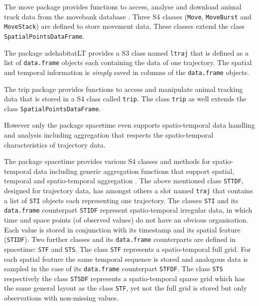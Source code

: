 \documentclass[12pt, oneside, a4paper]{scrbook}
\newcommand{\pkg}[1]{{\normalfont\fontseries{b}\selectfont #1}}
\let\code=\texttt
\begin{document}
The \pkg{move} package provides functions to access, analyse and download animal track data from the movebank database \citep{wikelski_movebank:_2011}. Three S4 classes (\code{Move}, \code{MoveBurst} and \code{MoveStack}) are defined to store movement data. These classes extend the class \code{SpatialPointsDataFrame}. 
\par\medskip

The package \pkg{adehabitatLT} provides a S3 class named \code{ltraj} that is defined as a list of \code{data.frame} objects each containing the data of one trajectory. The spatial and temporal information is \textit{simply} saved in columns of the \code{data.frame} objects.
\par\medskip

The \pkg{trip} package provides functions to access and manipulate animal tracking data that is stored in a S4 class called \code{trip}. The class \code{trip} as well extends the class \code{SpatialPointsDataFrame}.
\par\medskip

However only the package \pkg{spacetime} even supports spatio-temporal data handling and analysis including aggregation that respects the spatio-temporal characteristics of trajectory data.
\par\medskip

The package \pkg{spacetime} provides various S4 classes and methods for spatio-temporal data including generic aggregation functions that support spatial, temporal and spatio-temporal aggregation \citep{pebesma_spacetime:_2012}. The above mentioned class \code{STTDF}, designed for trajectory data, has amongst others a slot named \code{traj} that contains a list of \code{STI} objects each representing one trajectory.
The classes \code{STI} and its \code{data.frame} counterpart \code{STIDF} represent spatio-temporal irregular data, in which time and space points (of observed values) do not have an obvious organisation. Each value is stored in conjunction with its timestamp and its spatial feature (\code{STIDF}).
Two further classes and its \code{data.frame} counterparts are defined in \pkg{spacetime}: \code{STF} and \code{STS}. The class \code{STF} represents a spatio-temporal full grid. For each spatial feature the same temporal sequence is stored and analogous data is sampled in the case of its \code{data.frame} counterpart \code{STFDF}.
The class \code{STS} respectively the class \code{STSDF} represents a spatio-temporal sparse grid which has the same general layout as the class \code{STF}, yet not the full grid is stored but only observations with non-missing values.
\par\medskip
\end{document}
